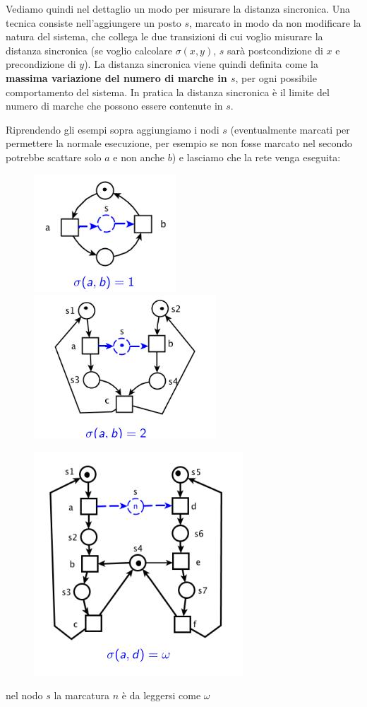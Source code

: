 \documentclass[a4paper,12pt, oneside]{book}
\begin{document}
Vediamo quindi nel dettaglio un modo per misurare la distanza sincronica. Una
tecnica consiste nell'aggiungere un posto $s$, marcato in modo da non modificare
la natura del sistema, che collega le due transizioni di cui voglio misurare la
distanza sincronica (se voglio calcolare $\sigma(x,y)$, $s$ sarà postcondizione
di $x$ e precondizione di $y$). La distanza sincronica viene quindi definita
come la \textbf{massima variazione del numero di marche in $s$}, per ogni
possibile comportamento del sistema. In pratica la distanza sincronica è il
limite del numero di marche che possono essere contenute in $s$.
\newpage
\begin{esempio}
  Riprendendo gli esempi sopra aggiungiamo i nodi $s$ (eventualmente marcati per
  permettere la normale esecuzione, per esempio se non fosse marcato nel secondo
  potrebbe scattare solo $a$ e non anche $b$) e lasciamo che la rete venga
  eseguita: 
  \begin{figure}[H]
    \centering
    \includegraphics[scale = 0.7]{img/ds4.jpg}
    \includegraphics[scale = 0.7]{img/ds5.jpg}
  \end{figure}
  \begin{figure}[H]
    \centering
    \includegraphics[scale = 0.6]{img/ds6.jpg}
  \end{figure}
  nel nodo $s$ la marcatura $n$ è da leggersi come $\omega$
\end{esempio}
\end{document}
